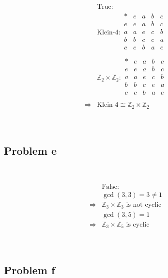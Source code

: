 \documentclass{article}
\begin{document}
\begin{equation*}
    \begin{split}
        &\text{True}:\\
        &\text{Klein-4}:\begin{array}{c|cccc}
            \ast&e&a&b&c\\
            \hline
            e&e&a&b&c\\
            a&a&e&c&b\\
            b&b&c&e&a\\
            c&c&b&a&e\\
        \end{array}\\
        &\mathbb{Z} _2\times\mathbb{Z} _2:\begin{array}{c|cccc}
            \ast&e&a&b&c\\
            \hline
            e&e&a&b&c\\
            a&a&e&c&b\\
            b&b&c&e&a\\
            c&c&b&a&e\\
        \end{array}\\
        \Rightarrow&\text{Klein-4}\cong\mathbb{Z} _2\times\mathbb{Z} _2\\
    \end{split}
\end{equation*}

~

\subsection*{Problem e}

~

\begin{equation*}
    \begin{split}
        &\text{False}:\\
        &\gcd(3,3)=3\ne1\\
        \Rightarrow&\mathbb{Z} _3\times\mathbb{Z} _3\text{ is not cyclic}\\
        &\gcd(3,5)=1\\
        \Rightarrow&\mathbb{Z} _3\times\mathbb{Z} _5\text{ is cyclic}\\
    \end{split}
\end{equation*}

~

\subsection*{Problem f}
\end{document}
